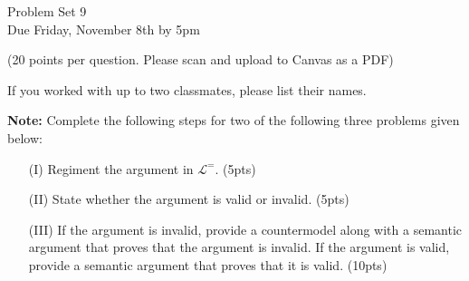 \documentclass[12pt]{article}
\newcommand{\FI}{\mathcal{L}^=} %
\begin{document}
\thispagestyle{empty}

\begin{center}
  \Large Problem Set 9\\[1ex] 
  Due Friday, November 8th by 5pm
  \vspace{.15in}

  \normalsize{(20 points per question. Please scan and upload to Canvas as a PDF)}\\[3ex] 
\end{center}

If you worked with up to two classmates, please list their names.

\bigskip

\textbf{Note:} Complete the following steps for two of the following three problems given below:

\bigskip

\begin{enumerate}
  \item[(I)] Regiment the argument in $\FI$. (5pts)
  \item[(II)] State whether the argument is valid or invalid. (5pts) 
  \item[(III)] If the argument is invalid, provide a countermodel along with a semantic argument that proves that the argument is invalid. If the argument is valid, provide a semantic argument that proves that it is valid. (10pts)
\end{enumerate}

\bigskip
\end{document}
